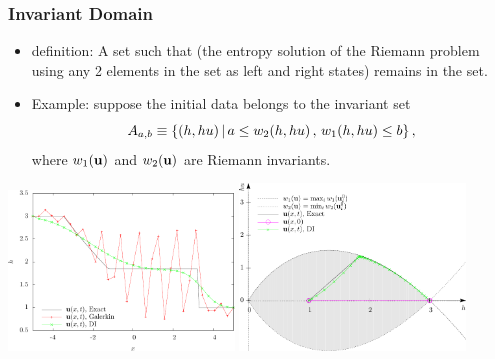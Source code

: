 \begin{frame}
\frametitle{Invariant Domain}

\begin{itemize}
  \item {} definition: A set such that (the entropy solution
    of the Riemann problem
    using any 2 elements in the set as left and right states) remains in the set.
  \item Example: suppose the initial data belongs to the invariant set 
    \[
      A_{a,b} \equiv \{(h,h u) \,|\,
        a \leq w_2(h, h u) \,, \, w_1(h, h u) \leq b\} \,,
    \]
    where $w_1(\mathbf{u})$ and $w_2(\mathbf{u})$ are Riemann invariants.
\end{itemize}

\begin{center}
  \includegraphics[width=0.45\textwidth]{./figures/dam_break_height.pdf}
  \hspace{1ex}
  \includegraphics[width=0.45\textwidth]{./figures/dam_break_phase_without_galerkin.pdf}
\end{center}

\end{frame}

